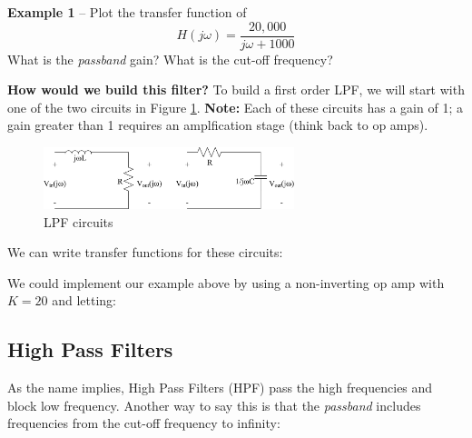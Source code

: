 \documentclass{handout}
\begin{document}
\textbf{Example 1} -- Plot the transfer function of 
\[
H(j\omega) = \frac{20,000}{j\omega +1000}
\]
What is the {\em passband} gain? What is the cut-off frequency?

\textbf{How would we build this filter?}  To build a first order LPF, we will start with one of the two circuits in Figure \ref{fig: LPF}. \textbf{Note:} Each of these circuits has a gain of 1; a gain greater than 1 requires an amplfication stage (think back to op amps).
\begin{figure} [h!]
\centering
\includegraphics[width=0.65\textwidth]{LPF.jpg}
\caption{LPF circuits}
\label{fig: LPF}
\end{figure}

We can write transfer functions for these circuits:
\soln{1.5in}{
\[
H(j\omega) = \frac{\frac{R}{L}}{j\omega +\frac{R}{L}}
\]
\[
H(j\omega) = \frac{\frac{1}{RC}}{j\omega +\frac{1}{RC}}
\]
}

We could implement our example above by using a non-inverting op amp with $K=20$ and letting:

\newpage
\clearpage
\pagebreak

\subsection{High Pass Filters}
As the name implies, High Pass Filters (HPF) pass the high frequencies and block low frequency.  Another way to say this is that the {\em passband} includes frequencies from the cut-off frequency to infinity:
\end{document}
